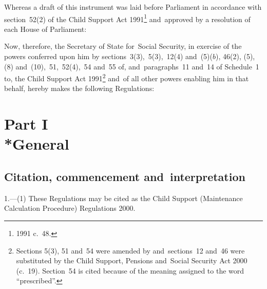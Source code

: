 \documentclass[12pt,a4paper]{article}
\title{\regstitle}
\author{S.I.~2001 No.~157}
\date{Made
18th January 2001\\
Coming into force
in accordance with regulation~1(5)
}
\begin{document}
\maketitle

\noindent
Whereas a draft of this instrument was laid before Parliament in accordance with section~52(2) of the Child Support Act 1991\footnote{1991 c.\ 48.} and~approved by a resolution of each House of Parliament:

Now, therefore, the Secretary of State for~Social Security, in exercise of the powers conferred upon him by sections~3(3),~5(3),~12(4) and~(5)($b$), 46(2), (5), (8) and~(10),~51,~52(4),~54 and~55 of, and~paragraphs~11 and~14 of Schedule~1 to, the Child Support Act 1991\footnote{Sections 5(3), 51 and~54 were amended by and~sections~12 and~46 were substituted by the Child Support, Pensions and~Social Security Act 2000 (c.\ 19). Section~54 is cited because of the meaning assigned to the word “prescribed”.} and~of all other powers enabling him in that behalf, hereby makes the following Regulations: 

{\sloppy

\tableofcontents

}

\bigskip

\setcounter{secnumdepth}{-2}

\section[Part I --- General]{Part I\\*General}

\renewcommand\parthead{--- Part I}

\subsection[1. Citation, commencement and~interpretation]{Citation, commencement and~interpretation}

1.---(1)  These Regulations may be cited as the Child Support (Maintenance Calculation Procedure) Regulations 2000.
\end{document}
